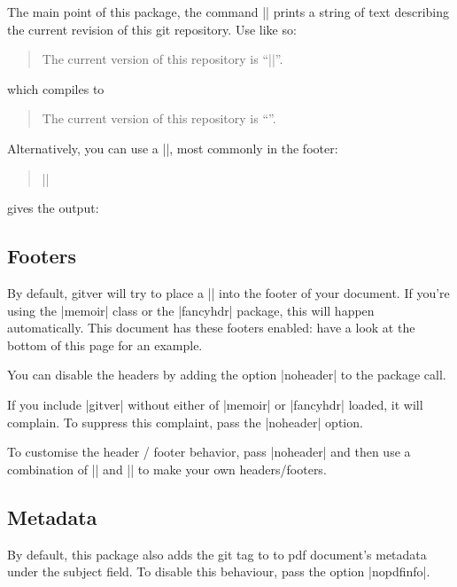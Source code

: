 \documentclass[a4paper]{ltxdoc}
\begin{document}

\DescribeMacro{\gitVer}
%
The main point of this package, the command |\gitVer| prints a string of text describing the current revision of this git repository. Use like so:
\begin{quote}
	The current version of this repository is ``|\gitVer{}|''.
\end{quote}
which compiles to
\begin{quote}
	The current version of this repository is ``\gitVer{}''.
\end{quote}

\DescribeMacro{\versionBox}
Alternatively, you can use a |\versionBox|, most commonly in the footer:
\begin{quote}
	|\versionBox{}|
\end{quote}
%
gives the output:
\vspace{3mm}

\versionBox{}

\subsection{Footers} %
\label{sub:footers}

By default, \textsf{gitver} will try to place a |\versionBox| into the footer of your document. If you're using the |memoir| class or the |fancyhdr| package, this will happen automatically. This document has these footers enabled: have a look at the bottom of this page for an example. 

You can disable the headers by adding the option |noheader| to the package call. 

If you include |gitver| without either of |memoir| or |fancyhdr| loaded, it will complain. To suppress this complaint, pass the |noheader| option. 

To customise the header / footer behavior, pass |noheader| and then use a combination of |\versionBox| and |\gitVer| to make your own headers/footers. 


\subsection{Metadata} %
\label{sub:metadata}

By default, this package also adds the git tag to to pdf document's metadata under the subject field. To disable this behaviour, pass the option |nopdfinfo|. 

\end{document}
